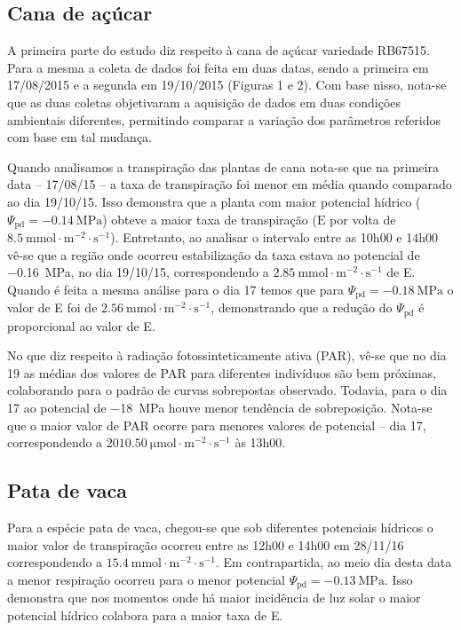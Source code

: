 \documentclass[a4paper, 12pt]{article}
\begin{document}
	\subsection{Cana de açúcar}	
	A primeira parte do estudo diz respeito à cana de açúcar variedade RB67515. Para a mesma a coleta de dados foi feita em duas datas, sendo a primeira em 17/08/2015 e a segunda em 19/10/2015 (Figuras 1 e 2). Com base nisso, nota-se que as duas coletas objetivaram a aquisição de dados em duas condições ambientais diferentes, permitindo comparar a variação dos parâmetros referidos com base em tal mudança.
	
	Quando analisamos a transpiração das plantas de cana nota-se que na primeira data -- 17/08/15 -- a taxa de transpiração foi menor em média quando comparado ao dia 19/10/15. Isso demonstra que a planta com maior potencial hídrico ($\Psi_{\textrm{pd}}=\SI{-0.14}{\mega\pascal}$) obteve a maior taxa de transpiração ($\textrm{E}$ por volta de $\SI{8.5}{\milli\mole\cdot\meter^{-2}\cdot\second^{-1}}$). Entretanto, ao analisar o intervalo entre as 10h00 e 14h00 vê-se que a região onde ocorreu estabilização da taxa estava ao potencial de \SI{-.16}{\mega\pascal}, no dia 19/10/15, correspondendo a $\SI{2.85}{\milli\mole\cdot\meter^{-2}\cdot\second^{-1}}$ de E. Quando é feita a mesma análise para o dia 17 temos que para $\Psi_{\textrm{pd}}=\SI{-0.18}{\mega\pascal}$ o valor de E foi de $\SI{2.56}{\milli\mole\cdot\meter^{-2}\cdot\second^{-1}}$, demonstrando que a redução do $\Psi_{\textrm{pd}}$ é proporcional ao valor de E. 
	
	No que diz respeito à radiação fotossinteticamente ativa (PAR), vê-se que no dia 19 as médias dos valores de PAR para diferentes indivíduos são bem próximas, colaborando para o padrão de curvas sobrepostas observado. Todavia, para o dia 17 ao potencial de \SI{-18}{\mega\pascal} houve menor tendência de sobreposição. Nota-se que o maior valor de PAR ocorre para menores valores de potencial -- dia 17, correspondendo a $\SI{2010.50}{\micro\mole\cdot\meter^{-2}\cdot\second^{-1}}$ às 13h00.
	
	\subsection{Pata de vaca}
	Para a espécie pata de vaca, chegou-se que sob diferentes potenciais hídricos o maior valor de transpiração ocorreu entre as 12h00 e 14h00 em 28/11/16 correspondendo a $\SI{15.4}{\milli\mole\cdot\meter^{-2}\cdot\second^{-1}}$. Em contrapartida, ao meio dia desta data a menor respiração ocorreu para o menor potencial $\Psi_{\textrm{pd}}=\SI{-0.13}{\mega\pascal}$. Isso demonstra que nos momentos onde há maior incidência de luz solar o maior potencial hídrico colabora para a maior taxa de E.
	
\end{document}
